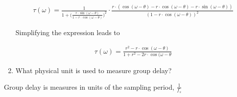 \begin{enumerate}
    \begin{align}
        \tau(\omega)=\frac{1}{1+\Big(\frac{r\cdot \sin(\omega-\theta)}{1-r\cdot\cos(\omega-\theta)}\Big)^2}\cdot  \frac{r \cdot (\cos(\omega-\theta)-r\cdot \cos(\omega-\theta)-r\cdot \sin(\omega-\theta))}{(1-r\cdot \cos(\omega-\theta))^2}
    \end{align}
    
    Simplifying the expression leads to

    \begin{align}
        \tau(\omega)=\frac{r^2-r\cdot \cos(\omega-\theta)}{1+r^2-2r\cdot \cos(\omega-\theta}
    \end{align}

    \item What physical unit is used to measure group delay?
    \end{enumerate}
    
    Group delay is measures in units of the sampling period, $\frac{1}{f_s}$